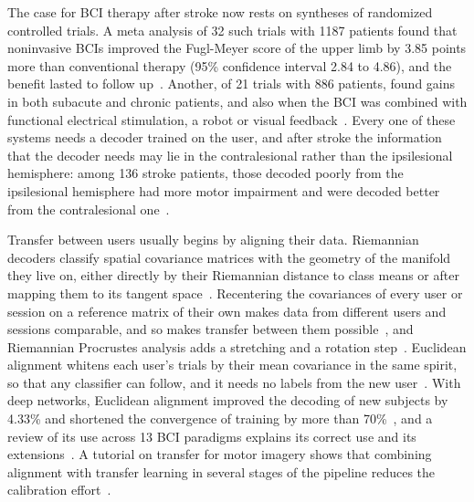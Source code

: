 \documentclass{ieeeaccess}
\begin{document}
The case for BCI therapy after stroke now rests on syntheses of randomized controlled trials. A meta analysis of 32 such trials with 1187 patients found that noninvasive BCIs improved the Fugl-Meyer score of the upper limb by 3.85 points more than conventional therapy (95\% confidence interval 2.84 to 4.86), and the benefit lasted to follow up~\cite{mortezaei2026}. Another, of 21 trials with 886 patients, found gains in both subacute and chronic patients, and also when the BCI was combined with functional electrical stimulation, a robot or visual feedback~\cite{li2025bci}. Every one of these systems needs a decoder trained on the user, and after stroke the information that the decoder needs may lie in the contralesional rather than the ipsilesional hemisphere: among 136 stroke patients, those decoded poorly from the ipsilesional hemisphere had more motor impairment and were decoded better from the contralesional one~\cite{mansour2022}.

Transfer between users usually begins by aligning their data. Riemannian decoders classify spatial covariance matrices with the geometry of the manifold they live on, either directly by their Riemannian distance to class means or after mapping them to its tangent space~\cite{barachant2012}. Recentering the covariances of every user or session on a reference matrix of their own makes data from different users and sessions comparable, and so makes transfer between them possible~\cite{zanini2018}, and Riemannian Procrustes analysis adds a stretching and a rotation step~\cite{rodrigues2019}. Euclidean alignment whitens each user's trials by their mean covariance in the same spirit, so that any classifier can follow, and it needs no labels from the new user~\cite{he2020}. With deep networks, Euclidean alignment improved the decoding of new subjects by 4.33\% and shortened the convergence of training by more than 70\%~\cite{junqueira2024}, and a review of its use across 13 BCI paradigms explains its correct use and its extensions~\cite{wu2025ea}. A tutorial on transfer for motor imagery shows that combining alignment with transfer learning in several stages of the pipeline reduces the calibration effort~\cite{wu2022tutorial}.
\end{document}
